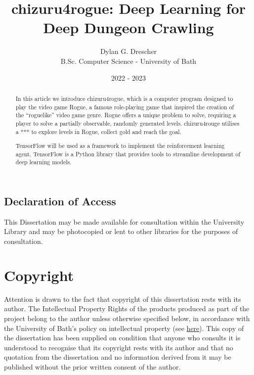 \documentclass[11pt,a4paper]{article}
\begin{document}
\title{chizuru4rogue: Deep Learning for Deep Dungeon Crawling}
\author{Dylan G. Drescher \\[1ex] B.Sc. Computer Science - University of Bath}
\date{2022 - 2023}
\maketitle

\begin{abstract}
    In this article we introduce chizuru4rogue, which is a computer program designed to play the video game Rogue, a famous role-playing game that inspired the creation of the ``roguelike'' video game genre. Rogue offers a unique problem to solve, requiring a player to solve a partially observable, randomly generated levels. chizuru4rouge utilises a *** to explore levels in Rogue, collect gold and reach the goal.

    TensorFlow will be used as a framework to implement the reinforcement learning agent. TensorFlow is a Python library that provides tools to streamline development of deep learning models.
\end{abstract}

\setcounter{page}{0}
\thispagestyle{empty}

\newpage
{}

\begin{center}
    \section*{Declaration of Access}

    This Dissertation may be made available for consultation within the University Library and may be photocopied or lent to other libraries for the purposes of consultation.
\end{center}

\newpage

\section*{Copyright}
Attention is drawn to the fact that copyright of this dissertation rests with its author. The Intellectual Property Rights of the products produced as part of the project belong to the author unless otherwise specified below, in accordance with the University of Bath's policy on intellectual property (see \href{https://www.bath.ac.uk/publications/university-ordinances/attachments/Ordinances_1_October_2020.pdf}{here}). This copy of the dissertation has been supplied on condition that anyone who consults it is understood to recognise that its copyright rests with its author and that no quotation from the dissertation and no information derived from it may be published without the prior written consent of the author.
\end{document}
